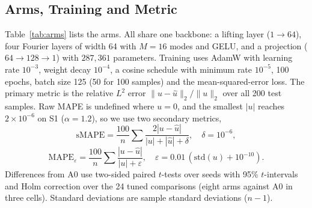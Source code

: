 \documentclass[conference]{IEEEtran}
\begin{document}
\subsection{Arms, Training and Metric}
Table~\ref{tab:arms} lists the arms. All share one backbone: a lifting layer ($1\to64$), four Fourier layers of width 64 with $M=16$ modes and GELU, and a projection ($64\to128\to1$) with $287{,}361$ parameters. Training uses AdamW with learning rate $10^{-3}$, weight decay $10^{-4}$, a cosine schedule with minimum rate $10^{-5}$, 100 epochs, batch size 125 (50 for 100 samples) and the mean-squared-error loss. The primary metric is the relative $L^2$ error $\|u-\hat u\|_2/\|u\|_2$ over all 200 test samples. Raw MAPE is undefined where $u=0$, and the smallest $|u|$ reaches $2\times10^{-6}$ on S1 ($\alpha=1.2$), so we use two secondary metrics,
\begin{equation}
\mathrm{sMAPE}=\frac{100}{n}\sum \frac{2|u-\hat u|}{|u|+|\hat u|+\delta},\quad \delta=10^{-6},
\label{eq:smape}
\end{equation}
\begin{equation}
\mathrm{MAPE}_\varepsilon=\frac{100}{n}\sum\frac{|u-\hat u|}{|u|+\varepsilon},\quad \varepsilon=0.01\,(\mathrm{std}(u)+10^{-10}).
\label{eq:mapee}
\end{equation}
Differences from A0 use two-sided paired $t$-tests over seeds with 95\% $t$-intervals and Holm correction over the 24 tuned comparisons (eight arms against A0 in three cells). Standard deviations are sample standard deviations ($n-1$).
\end{document}
